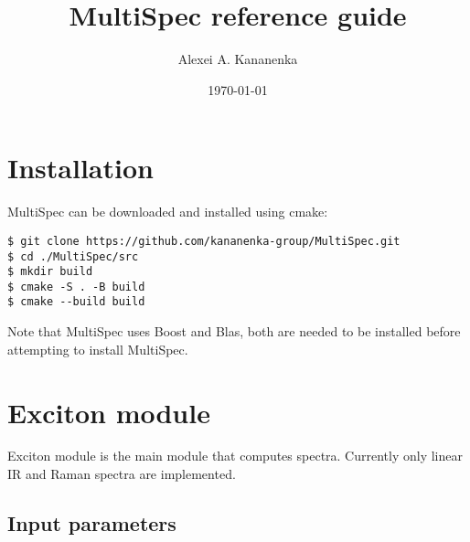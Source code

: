 \documentclass{article}
\begin{document}
\title{MultiSpec reference guide}
\author{Alexei A. Kananenka}
\date{\today}
\maketitle
\tableofcontents

\section{Installation}
MultiSpec can be downloaded and installed using cmake:
\begin{verbatim}
$ git clone https://github.com/kananenka-group/MultiSpec.git
$ cd ./MultiSpec/src
$ mkdir build 
$ cmake -S . -B build
$ cmake --build build
\end{verbatim}

Note that MultiSpec uses Boost and Blas, both are needed to be installed before attempting to install MultiSpec.

\section{Exciton module}
Exciton module is the main module that computes spectra. Currently only linear IR and Raman spectra are implemented.

\subsection{Input parameters}
\end{document}
